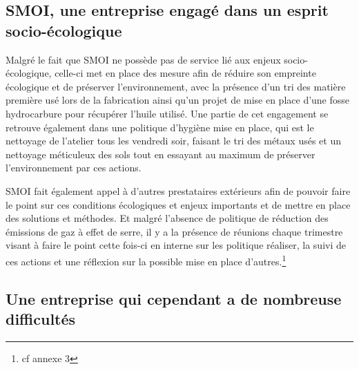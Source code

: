 \subsection{SMOI, une entreprise engagé dans un esprit socio-écologique}

Malgré le fait que SMOI ne possède pas de service lié aux enjeux socio-écologique, celle-ci met en place des mesure afin de réduire son empreinte écologique et de préserver l'environnement, avec la présence d'un tri des matière première usé lors de la fabrication ainsi qu'un projet de mise en place d'une fosse hydrocarbure pour récupérer l'huile utilisé. Une partie de cet engagement se retrouve également dans une politique d'hygiène mise en place, qui est le nettoyage de l'atelier tous les vendredi soir, faisant le tri des métaux usés et un nettoyage méticuleux des sols tout en essayant au maximum de préserver l'environnement par ces actions. \newline

SMOI fait également appel à d'autres prestataires extérieurs afin de pouvoir faire le point sur ces conditions écologiques et enjeux importants et de mettre en place des solutions et méthodes. Et malgré l'absence de politique de réduction des émissions de gaz à effet de serre, il y a la présence de réunions chaque trimestre visant à faire le point cette fois-ci en interne sur les politique réaliser, la suivi de ces actions et une réflexion sur la possible mise en place d'autres.\footnote{cf annexe 3}



\subsection{Une entreprise qui cependant a de nombreuse difficultés}

